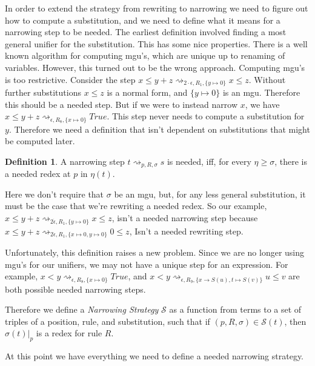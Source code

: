 \documentclass{book}
\theoremstyle{definition}
\newtheorem{definition}{Definition}[section]
\begin{document}
In order to extend the strategy from rewriting to narrowing we need
to figure out how to compute a substitution,
and we need to define what it means for a narrowing step to be needed.
The earliest definition involved finding a most general unifier for the substitution.
This has some nice properties.
There is a well known algorithm for computing mgu's, which are unique up to renaming of variables.
However, this turned out to be the wrong approach.
Computing mgu's is too restrictive.
Consider the step $x \le y + z \rightsquigarrow_{2\cdot \epsilon,R_1,\{y \mapsto 0\}} x \le z$.  
Without further substitutions $x \le z$ is a normal form, and $\{y \mapsto 0\}$ is an mgu.
Therefore this should be a needed step.
But if we were to instead narrow $x$, 
we have $x \le y + z \rightsquigarrow_{\epsilon,R_8,\{x \mapsto 0\}} True$.
This step never needs to compute a substitution for $y$.
Therefore we need a definition that isn't dependent on substitutions that might be computed later.


\theoremstyle{definition}
\begin{definition}
    A narrowing step $t \rightsquigarrow_{p, R, \sigma} s$ is needed, 
    iff, for every $\eta \ge \sigma$,
    there is a needed redex at $p$ in $\eta(t)$.
\end{definition}

Here we don't require that $\sigma$ be an mgu, but, for any less general substitution,
it must be the case that we're rewriting a needed redex.
So our example, $x \le y + z \rightsquigarrow_{2\dot \epsilon,R_1,\{y \mapsto 0\}} x \le z$,
isn't a needed narrowing step because $x \le y + z \rightsquigarrow_{2\dot \epsilon,R_1,\{x \mapsto 0, y \mapsto 0\}} 0 \le z$,
Isn't a needed rewriting step.

Unfortunately, this definition raises a new problem.
Since we are no longer using mgu's for our unifiers, we may not have a unique step for an expression.
For example, $x < y \rightsquigarrow_{\epsilon, R_8, \{x\mapsto 0\}} True $, and
$x < y \rightsquigarrow_{\epsilon, R_9, \{x\rightarrow S(u), t \mapsto S(v)\}} u \le v $
are both possible needed narrowing steps.

Therefore we define a \emph{Narrowing Strategy} 
$\mathcal{S}$ as a function from terms
to a set of triples of a position, rule, and substitution, such that if $(p, R, \sigma) \in \mathcal{S}(t)$,
then $\sigma(t)\vert_p$ is a redex for rule $R$.

At this point we have everything we need to define a needed narrowing strategy.
\end{document}
